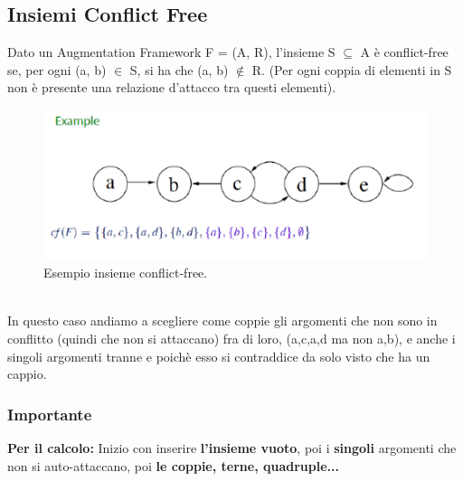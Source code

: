 \subsection{Insiemi Conflict Free}
Dato un Augmentation Framework F = (A, R), l’insieme S $\subseteq$ A è conflict-free se, per ogni (a, b) $\in$ S, si ha che (a, b) $\notin$ R. (Per ogni coppia di elementi in S non è presente una relazione d’attacco tra questi elementi).
\begin{figure}[htp]
	\centering
    \includegraphics[width=12cm, keepaspectratio]{img/Cap6/cf.png}
    \caption{Esempio insieme conflict-free.}
\end{figure}
\\In questo caso andiamo a scegliere come coppie gli argomenti che non sono in conflitto (quindi che non si attaccano) fra di loro, ({a,c},{a,d} ma non {a,b}), e anche i singoli argomenti tranne e poichè esso si contraddice da solo visto che ha un cappio.

\subsubsection{\textbf{Importante}}
\textbf{Per il calcolo:} Inizio con inserire \textbf{l’insieme vuoto}, poi i \textbf{singoli} argomenti che non si auto-attaccano, poi \textbf{le coppie, terne, quadruple...}

